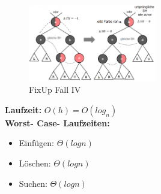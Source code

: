 \documentclass{article}
\begin{document}
            \begin{figure}[ht]
                \centering
                \includegraphics[width=0.5\textwidth]{Bilder/RSFixupIV.png}
                \caption{FixUp Fall IV}
                \label{fig:RSFixupIV}
            \end{figure}
            \newpage
            \textbf{Laufzeit:} $O(h) = O(log_n)$\\
            \textbf{Worst- Case- Laufzeiten:}\\
            \begin{itemize}
                \item Einfügen: $\Theta(log n)$
                \item Löschen: $\Theta(log n)$
                \item Suchen: $\Theta(log n)$
            \end{itemize}
\end{document}

